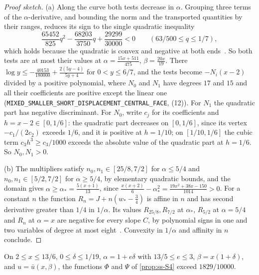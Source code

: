 \begin{proof}[Proof sketch]
(a) Along the curve both tests decrease in $\alpha$. Grouping three terms of the
$\alpha$-derivative, and bounding the norm and the transported quantities by their ranges,
reduces its sign to the single quadratic inequality
\[
  \frac{65452}{825}q^2-\frac{68203}{3750}q+\frac{29299}{30000}<0
  \qquad(63/500\le q\le1/7),
\]
which holds because the quadratic is convex and negative at both ends~\cite{LighterProofs}. So
both tests are at most their values at $\alpha=\frac{15x+511}{475}$, $\beta=\frac{20x}{19}$. There
$\log y\le-\frac{40153}{180000}+\frac{2(5y-4)}{5y+4}$ for $0<y\le6/7$, and the tests become
$-N_i(x-2)$ divided by a positive polynomial, where $N_0$ and $N_1$ have degrees $17$ and $15$ and
all their coefficients are positive except the linear one~\cite{Notes}
(\texttt{MIXED\_SMALLER\_SHORT\_DISPLACEMENT\_CENTRAL\_FACE}, (12)). For $N_1$ the quadratic part
has negative discriminant. For $N_0$, write $c_j$ for its coefficients and $h=x-2\in[0,1/6]$: the
quadratic part decreases on $[0,1/6]$, since its vertex $-c_1/(2c_2)$ exceeds $1/6$, and it is
positive at $h=1/10$; on $[1/10,1/6]$ the cubic term $c_3h^3\ge c_3/1000$ exceeds the absolute
value of the quadratic part at $h=1/6$. So $N_0,N_1>0$.

(b) The multipliers satisfy $n_0,n_1\in[25/8,7/2]$ for $\alpha\le5/4$ and $n_0,n_1\in[5/2,7/2]$ for
$\alpha\ge5/4$, by elementary quadratic bounds, and the domain gives
$\alpha\ge\alpha_*=\frac{5(x+1)}{13}$, since $\frac{x(x+2)}6-\alpha_*^2=\frac{19x^2+38x-150}{1014}>0$.
For a constant $n$ the function $R_n=J+n(w_*-\frac34)$ is affine in $n$ and has second derivative
greater than $1/4$ in $1/\alpha$. Its values $R_{25/8},R_{7/2}$ at $\alpha_*$, $R_{5/2}$ at
$\alpha=5/4$ and $R_n$ at $\alpha=x$ are negative for every slope $C$, by polynomial signs in one
and two variables of degree at most eight~\cite{LighterProofs}. Convexity in $1/\alpha$ and
affinity in $n$ conclude.
\end{proof}

\begin{proposition}\label{prop:ss-face-S4}
On $2\le x\le13/6$, $0\le\delta\le1/19$, $\alpha=1+e\delta$ with $13/5\le e\le3$,
$\beta=x(1+\delta)$, and $u=\bar u(x,\beta)$, the functions $\Phi$ and $\Psi$ of
\cref{prop:ss-S4} exceed $1829/10000$.
\end{proposition}

